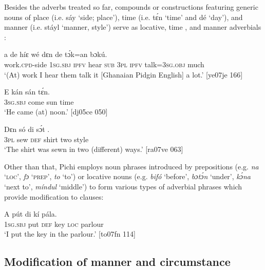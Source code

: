 Besides the adverbs treated so far, compounds  or constructions featuring generic nouns of place (i.e. sáy ‘side; place’), time (i.e. tɛ́n ‘time’ and dé ‘day’), and manner (i.e. stáyl ‘manner, style’) serve as locative{\fff}, time , and manner adverbials :


\ea%
    \label{ex:key:873}
    \gll {}    a    de  híɛ    wé  dɛn  de  tɔ́k=an    bɔkú.\\
work.\textsc{cpd}{}-side  \textsc{1sg.sbj}  \textsc{ipfv}  hear    \textsc{sub}  \textsc{3pl}  \textsc{ipfv}  talk=\textsc{3sg.obj}  much\\

\glt ‘(At) work I hear them talk it [Ghanaian Pidgin English] a lot.’ [ye07je 166]
\z


\ea%
    \label{ex:key:874}
    \gll E    kán    sán  tɛ́n.\\
\textsc{3sg.sbj}  come  sun  time\\

\glt ‘He came (at) noon.’ [dj05ce 050]
\z


\ea%
    \label{ex:key:875}
    \gll Dɛn  só  di  sɔ́t      .\\
\textsc{3pl}  sew  \textsc{def}  shirt  two  style\\

\glt ‘The shirt was sewn in two (different) ways.’ [ra07ve 063]
\z

Other than that, Pichi employs noun phrases introduced by prepositions (e.g. \textit{na} ‘\textsc{loc}’, \textit{fɔ} ‘\textsc{prep}’, \textit{to} ‘to’) or locative nouns (e.g. \textit{bifó} ‘before’, \textit{bɔtɔ́n} ‘under’, \textit{kɔ́na} ‘next to’, \textit{míndul} ‘middle’) to form various types of adverbial phrases which provide modification to clauses: 


\ea%
    \label{ex:key:876}
    \gll \MakeUppercase{A}   pút  di  kí   pála.\\
\textsc{1sg.sbj}  put  \textsc{def}  key  \textsc{loc}  parlour\\

\glt ‘I put the key in the parlour.’ [to07fn 114]
\z

\subsection{Modification of manner and circumstance}\label{sec:7.7.2}

